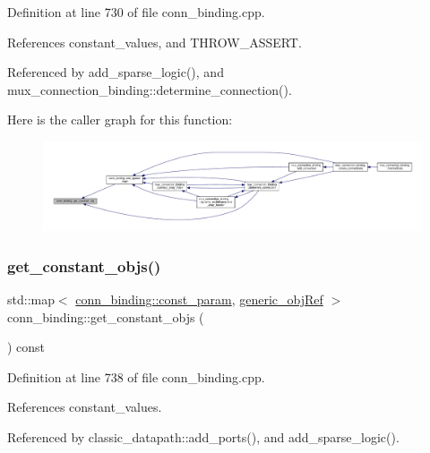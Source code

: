 Definition at line 730 of file conn\+\_\+binding.\+cpp.



References constant\+\_\+values, and T\+H\+R\+O\+W\+\_\+\+A\+S\+S\+E\+RT.



Referenced by add\+\_\+sparse\+\_\+logic(), and mux\+\_\+connection\+\_\+binding\+::determine\+\_\+connection().

Here is the caller graph for this function\+:
\nopagebreak
\begin{figure}[H]
\begin{center}
\leavevmode
\includegraphics[width=350pt]{d2/db1/classconn__binding_ae385543cd719612dd44a8a54b3df8ad8_icgraph}
\end{center}
\end{figure}
\mbox{\label{classconn__binding_a46ef802caccfc0f0fb9625b0ba99e5eb}} 
\subsubsection{\texorpdfstring{get\+\_\+constant\+\_\+objs()}{get\_constant\_objs()}}
{\footnotesize\ttfamily std\+::map$<$ \hyperlink{classconn__binding_a08cb5241cd588e215f61ab30d27a14c0}{conn\+\_\+binding\+::const\+\_\+param}, \hyperlink{generic__obj_8hpp_acb533b2ef8e0fe72e09a04d20904ca81}{generic\+\_\+obj\+Ref} $>$ conn\+\_\+binding\+::get\+\_\+constant\+\_\+objs (\begin{DoxyParamCaption}{ }\end{DoxyParamCaption}) const}



Definition at line 738 of file conn\+\_\+binding.\+cpp.



References constant\+\_\+values.



Referenced by classic\+\_\+datapath\+::add\+\_\+ports(), and add\+\_\+sparse\+\_\+logic().

